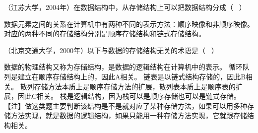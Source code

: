 \question （江苏大学，2004年）在数据结构中，从存储结构上可以把数据结构分成（ ~）
\par{}
\begin{solution}数据元素之间的关系在计算机中有两种不同的表示方法：顺序映像和非顺序映像。对应的两种不同的存储结构分别是顺序存储结构和链式存储结构。
\end{solution}
\question （北京交通大学，2000年）以下与数据的存储结构无关的术语是（ ~）
\par{}
\begin{solution}数据的物理结构又称为存储结构，是数据的逻辑结构在计算机中的表示。
循环队列是建立在顺序存储结构上的，因此A相关。
链表是以链式结构存储的，因此B相关。
散列存储方法本质上是顺序存储方法的扩展，散列表本质上是顺序表的扩展，因此C相关。
栈是逻辑结构，因为栈可以是顺序存储也可以是链式存储。
【注】做这类题主要判断该结构是不是就对应了某种存储方法，如果可以用多种存储方法实现，就是数据的逻辑结构，如果只能用一种存储方法实现，它就跟存储结构相关。
\end{solution}
